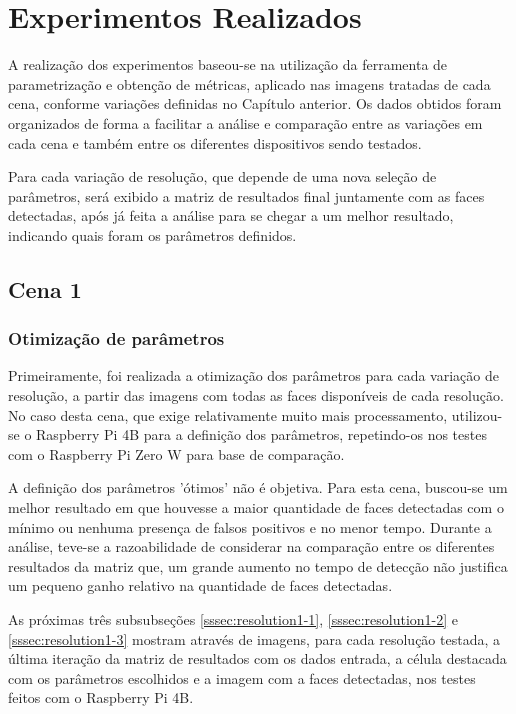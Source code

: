 \chapter{Experimentos Realizados}
\thispagestyle{plain}
\label{cap:experimentos}
\graphicspath{{./Cap4_Experimentos_Realizados/Figures/}}

A realização dos experimentos baseou-se na utilização da ferramenta de parametrização e obtenção de métricas, aplicado nas imagens tratadas de cada cena, conforme variações definidas no Capítulo anterior. Os dados obtidos foram organizados de forma a facilitar a análise e comparação entre as variações em cada cena e também entre os diferentes dispositivos sendo testados.

Para cada variação de resolução, que depende de uma nova seleção de parâmetros, será exibido a matriz de resultados final juntamente com as faces detectadas, após já feita a análise para se chegar a um melhor resultado, indicando quais foram os parâmetros definidos.

\section{Cena 1}

\subsection{Otimização de parâmetros}

Primeiramente, foi realizada a otimização dos parâmetros para cada variação de resolução, a partir das imagens com todas as faces disponíveis de cada resolução. No caso desta cena, que exige relativamente muito mais processamento, utilizou-se o Raspberry Pi 4B para a definição dos parâmetros, repetindo-os nos testes com o Raspberry Pi Zero W para base de comparação.

A definição dos parâmetros 'ótimos' não é objetiva. Para esta cena, buscou-se um melhor resultado em que houvesse a maior quantidade de faces detectadas com o mínimo ou nenhuma presença de falsos positivos e no menor tempo. Durante a análise, teve-se a razoabilidade de considerar na comparação entre os diferentes resultados da matriz que, um grande aumento no tempo de detecção não justifica um pequeno ganho relativo na quantidade de faces detectadas.

As próximas três subsubseções \ref{sssec:resolution1-1}, \ref{sssec:resolution1-2} e \ref{sssec:resolution1-3} mostram através de imagens, para cada resolução testada, a última iteração da matriz de resultados com os dados entrada, a célula destacada com os parâmetros escolhidos e a imagem com a faces detectadas, nos testes feitos com o Raspberry Pi 4B. 

